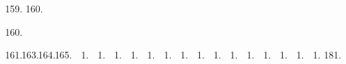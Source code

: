 \documentclass[10pt]{article}
\begin{document}
\begin{enumerate}
  \setcounter{enumi}{158}
  \item 
160.


  \item 
  \item 
  \begin{enumerate}
    \setcounter{enumii}{162}
    \item 
    \begin{enumerate}
      \setcounter{enumiii}{163}
      \item 
      \begin{enumerate}
        \setcounter{enumiv}{164}
        \item 
        \begin{enumerate}
          \item 
          \begin{enumerate}
            \item 
            \begin{enumerate}
              \item 
              \begin{enumerate}
                \item 
                \begin{enumerate}
                  \item 
                  \begin{enumerate}
                    \item 
                    \begin{enumerate}
                      \item 
                      \begin{enumerate}
                        \item 
                        \begin{enumerate}
                          \item 
                          \begin{enumerate}
                            \item 
                            \begin{enumerate}
                              \item 
                              \begin{enumerate}
                                \item 
                                \begin{enumerate}
                                  \item 
                                  \begin{enumerate}
                                    \item 
                                    \begin{enumerate}
                                      \item 
181.



\end{enumerate}
\end{enumerate}
\end{enumerate}
\end{enumerate}
\end{enumerate}
\end{enumerate}
\end{enumerate}
\end{enumerate}
\end{enumerate}
\end{enumerate}
\end{enumerate}
\end{enumerate}
\end{enumerate}
\end{enumerate}
\end{enumerate}
\end{enumerate}
\end{enumerate}
\end{enumerate}
\end{enumerate}
\end{document}
